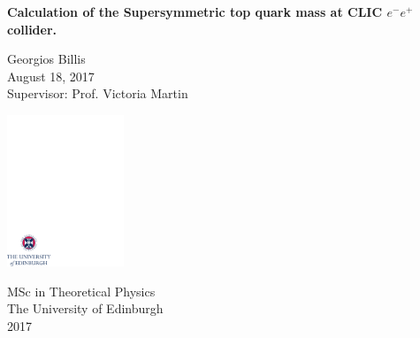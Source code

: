\documentclass[12pt,a4paper]{report}
\begin{document}
\thispagestyle{empty}

%
\parindent=10pt          %
\parskip=5pt            %
%
%

\vspace*{0.1\textheight}

\begin{center}
        \huge{\bfseries Calculation of the Supersymmetric top quark mass at CLIC $e^{-}e^{+}$ collider.}\\
\end{center}

\bigskip

\begin{center}
        \large{Georgios Billis}\\      %
        \bigskip
        \large{August 18, 2017}\\        %
        \bigskip
        \large{Supervisor: Prof. Victoria Martin}        %

\end{center}

\vspace*{0.35\textheight}

\begin{center}
        \includegraphics[width=35mm]{crest.pdf}
\end{center}

\medskip

\begin{center}

\large{
  MSc in Theoretical Physics\\[0.8ex]
  The University of Edinburgh\\[0.8ex]
  2017
}

\end{center}
\end{document}
